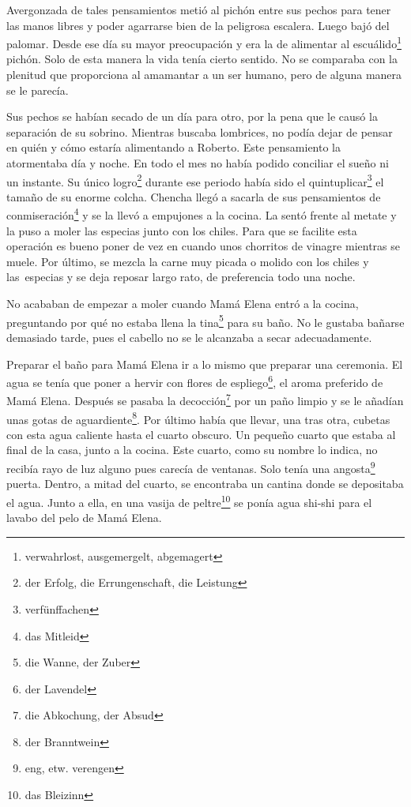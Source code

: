 Avergonzada de tales pensamientos metió al pichón entre sus pechos para
tener las manos libres y poder agarrarse bien de la peligrosa escalera.
Luego bajó del palomar. Desde ese día su mayor preocupación y era la de
alimentar al escuálido\footnote{verwahrlost, ausgemergelt, abgemagert}
pichón. Solo de esta manera la vida tenía cierto sentido. No se comparaba
con la plenitud que proporciona al amamantar a un ser humano, pero de alguna
manera se le parecía.

Sus pechos se habían secado de un día para otro, por la pena que le
causó la separación de su sobrino. Mientras buscaba lombrices, no podía
dejar de pensar en quién y cómo estaría alimentando a Roberto. Este
pensamiento la atormentaba día y noche. En todo el mes no había podido
conciliar el sueño ni un instante. Su único logro\footnote{der Erfolg, die Errungenschaft, die Leistung}
durante ese periodo había sido el quintuplicar\footnote{verfünffachen}
el tamaño de su enorme colcha. Chencha llegó a sacarla de sus pensamientos
de conmiseración\footnote{das Mitleid} y se la llevó a
empujones a la cocina. La sentó frente al metate y la puso a moler las especias
junto con los chiles. Para que se facilite esta operación es bueno poner
de vez en cuando unos chorritos de vinagre mientras se muele. Por
último, se mezcla la carne muy picada o molido con los chiles y las~especias y se deja reposar largo rato, de preferencia todo una
noche.

No acababan de empezar a moler cuando Mamá Elena entró a la cocina,
preguntando por qué no estaba llena la tina\footnote{die Wanne, der Zuber}
para su baño. No le gustaba bañarse demasiado tarde, pues el cabello
no se le alcanzaba a secar adecuadamente.

Preparar el baño para Mamá Elena ir a lo mismo que preparar una
ceremonia. El agua se tenía que poner a hervir con flores de espliego\footnote{der Lavendel},
el aroma preferido de Mamá Elena. Después se pasaba la \glqq{}decocción\grqq{}\footnote{die Abkochung, der Absud}
por un paño limpio y se le añadían unas gotas de aguardiente\footnote{der Branntwein}.
Por último había que llevar, una tras otra, cubetas con esta agua caliente
hasta el cuarto obscuro. Un pequeño cuarto que estaba al final de la
casa, junto a la cocina. Este cuarto, como su nombre lo indica, no recibía rayo de
luz alguno pues carecía de ventanas. Solo tenía una angosta\footnote{eng, etw. verengen}
puerta. Dentro, a mitad del cuarto, se encontraba un cantina donde se depositaba
el agua. Junto a ella, en una vasija de peltre\footnote{das Bleizinn}
se ponía agua shi-shi para el lavabo del pelo de Mamá Elena.

